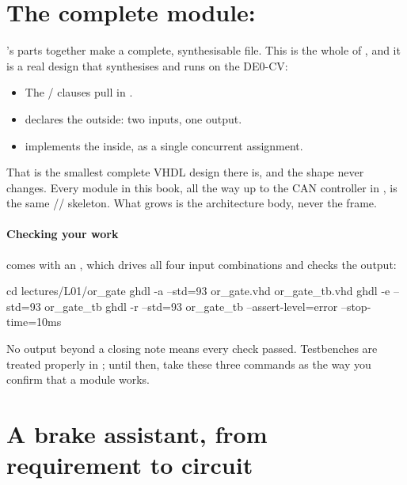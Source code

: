 \section{The complete module: }
\label{c1:sec:module}

's parts together make a complete, synthesisable file. This is the whole of
, and it is a real design that synthesises and runs on the DE0-CV:


\begin{itemize}
  \item The / clauses pull in .
  \item {} declares the outside: two inputs, one output.
  \item {} implements the inside, as a single concurrent assignment.
\end{itemize}

That is the smallest complete VHDL design there is, and the shape never changes. Every module in
this book, all the way up to the CAN controller in , is the same
// skeleton. What grows is the architecture body,
never the frame.

\paragraph{Checking your work}
 comes with an , which drives all four input combinations and
checks the output:

\begin{shell}
cd lectures/L01/or_gate
ghdl -a --std=93 or_gate.vhd or_gate_tb.vhd
ghdl -e --std=93 or_gate_tb
ghdl -r --std=93 or_gate_tb --assert-level=error --stop-time=10ms
\end{shell}

No output beyond a closing note means every check passed. Testbenches are treated properly in
; until then, take these three commands as the way you confirm that a
module works.

\section{A brake assistant, from requirement to circuit}
\label{c1:sec:adas}

